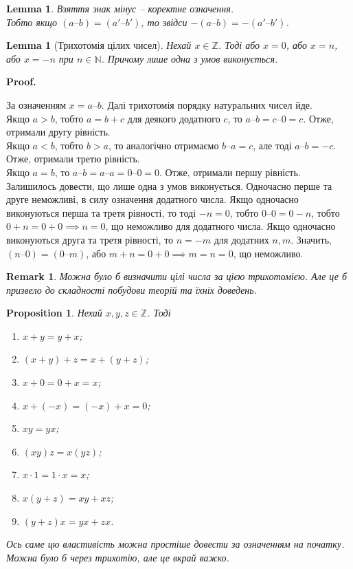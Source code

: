 \documentclass[a4paper, 14pt]{extarticle}
\makeatletter
\theoremstyle{theoremdd}
\theoremstyle{theoremdd}
\theoremstyle{theoremdd}
\theoremstyle{theoremdd}
\theoremstyle{theoremdd}
\theoremstyle{theoremdd}
\theoremstyle{theoremdd}
\theoremstyle{theoremdd}
\theoremstyle{theoremdd}
\theoremstyle{theoremdd}
\newtheorem{proposition}[theorem]{Proposition}
\theoremstyle{theoremdd}
\theoremstyle{theoremdd}
\newtheorem{remark}[theorem]{Remark}
\theoremstyle{theoremdd}
\theoremstyle{theoremdd}
\newtheorem{lemma}[theorem]{Lemma}
\theoremstyle{theoremdd}
\theoremstyle{theoremdd}
\renewenvironment{proof}[1][Proof.\\]{\par
\pushQED{\hfill \qed}%
\normalfont \topsep6\p@\@plus6\p@\relax
\trivlist
\item\relax
{\bfseries
#1\@addpunct{.}}\hspace\labelsep\ignorespaces
}{%
\popQED\endtrivlist\@endpefalse
}
\newcommand{\subtract}{\text{--}}
\makeatother
\begin{document}
\begin{lemma}
Взяття знак мінус -- коректне означення.\\
Тобто якщо $(a\subtract b) = (a' \subtract b')$, то звідси $-(a \subtract b) = -(a' \subtract b')$.
\end{lemma}

\begin{lemma}[Трихотомія цілих чисел]
Нехай $x \in \mathbb{Z}$. Тоді або $x = 0$, або $x = n$, або $x = -n$ при $n \in \mathbb{N}$. Причому лише одна з умов виконується. 
\end{lemma}

\begin{proof}
За означенням $x = a \subtract b$. Далі трихотомія порядку натуральних чисел йде.\\
Якщо $a > b$, тобто $a = b + c$ для деякого додатного $c$, то $a \subtract b = c \subtract 0 = c$. Отже, отримали другу рівність.\\
Якщо $a < b$, тобто $b > a$, то аналогічно отримаємо $b \subtract a = c$, але тоді $a \subtract b = -c$. Отже, отримали третю рівність.\\
Якщо $a = b$, то $a \subtract b = a \subtract a = 0 \subtract 0 = 0$. Отже, отримали першу рівність.
\bigskip \\
Залишилось довести, що лише одна з умов виконується. Одночасно перше та друге неможливі, в силу означення додатного числа. Якщо одночасно виконуються перша та третя рівності, то тоді $-n = 0$, тобто $0 \subtract 0 = 0 - n$, тобто $0 + n = 0 + 0 \implies n = 0$, що неможливо для додатного числа. Якщо одночасно виконуються друга та третя рівності, то $n = -m$ для додатних $n,m$. Значить, $(n \subtract 0) = (0 \subtract m)$, або $m + n = 0 + 0 \implies m = n = 0$, що неможливо. 
\end{proof}

\begin{remark}
Можна було б визначити цілі числа за цією трихотомією. Але це б призвело до складності побудови теорій та їхніх доведень.
\end{remark}

\begin{proposition}
Нехай $x,y,z \in \mathbb{Z}$. Тоді
\begin{enumerate}[nosep,wide=0pt,label={\arabic*)}]
\item $x+y = y+x$;
\item $(x+y) + z = x+(y+z)$;
\item $x+0 = 0+x = x$;
\item $x+(-x) = (-x)+x = 0$;
\item $xy = yx$;
\item $(xy)z = x(yz)$;
\item $x \cdot 1 = 1 \cdot x = x$;
\item $x(y+z) = xy + xz$;
\item $(y+z)x = yx + zx$.
\end{enumerate}
\textit{Ось саме цю властивість можна простіше довести за означенням на початку. Можна було б через трихотію, але це вкрай важко.}
\end{proposition}
\end{document}
